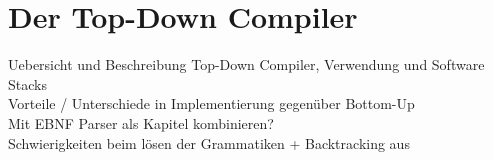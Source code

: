 \chapter{Der Top-Down Compiler}
\label{chap:theory:topDownCompiler}

Uebersicht und Beschreibung Top-Down Compiler, Verwendung und Software Stacks\\
Vorteile / Unterschiede in Implementierung gegenüber Bottom-Up\\
Mit EBNF Parser als Kapitel kombinieren?\\
Schwierigkeiten beim lösen der Grammatiken + Backtracking aus \cite[S.~46-51]{barrett1986compiler}
